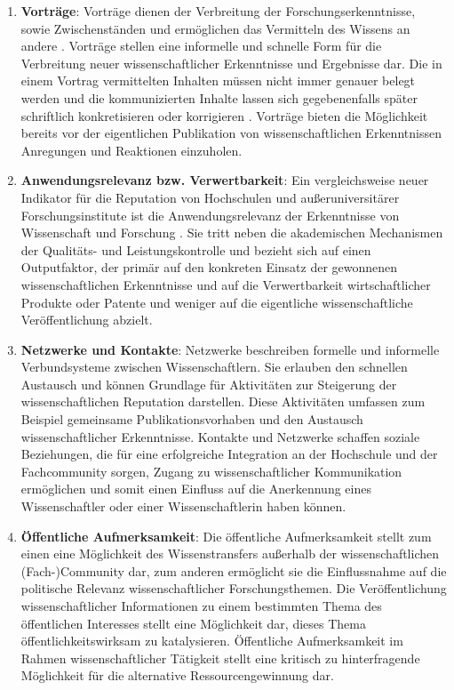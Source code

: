 \begin{enumerate}
\item \textbf{Vorträge}: Vorträge dienen der Verbreitung der Forschungserkenntnisse, sowie Zwischenständen und ermöglichen das Vermitteln des Wissens an andere \cite{Rassenhoevel_2010}. Vorträge stellen eine informelle und schnelle Form für die Verbreitung neuer wissenschaftlicher Erkenntnisse und Ergebnisse dar. Die in einem Vortrag vermittelten Inhalten müssen nicht immer genauer belegt werden und die kommunizierten Inhalte lassen sich gegebenenfalls später schriftlich konkretisieren oder korrigieren \cite{Haberle_2002}. Vorträge bieten die Möglichkeit bereits vor der eigentlichen Publikation von wissenschaftlichen Erkenntnissen Anregungen und Reaktionen einzuholen.
\item\textbf{Anwendungsrelevanz bzw. Verwertbarkeit}: Ein vergleichsweise neuer Indikator für die Reputation von Hochschulen und außeruniversitärer Forschungsinstitute ist die Anwendungsrelevanz der Erkenntnisse von Wissenschaft und Forschung \cite{Simon_2010}. Sie tritt
neben die akademischen Mechanismen der Qualitäts- und Leistungskontrolle \cite[:8]{Buss_2001} und bezieht sich auf einen Outputfaktor, der primär auf den konkreten Einsatz der gewonnenen wissenschaftlichen Erkenntnisse und auf die Verwertbarkeit wirtschaftlicher Produkte oder Patente und weniger auf die eigentliche wissenschaftliche Veröffentlichung abzielt.
\item \textbf{Netzwerke und Kontakte}: Netzwerke beschreiben formelle und informelle Verbundsysteme zwischen Wissenschaftlern. Sie erlauben den schnellen Austausch und können Grundlage für Aktivitäten zur Steigerung der wissenschaftlichen Reputation darstellen. Diese Aktivitäten umfassen zum Beispiel gemeinsame Publikationsvorhaben und den Austausch wissenschaftlicher Erkenntnisse. Kontakte und Netzwerke schaffen soziale Beziehungen, die für eine erfolgreiche Integration an der Hochschule und der Fachcommunity sorgen, Zugang zu wissenschaftlicher Kommunikation ermöglichen und somit einen Einfluss auf die Anerkennung eines Wissenschaftler oder einer Wissenschaftlerin haben können.
\item \textbf{Öffentliche Aufmerksamkeit}: Die öffentliche Aufmerksamkeit stellt zum einen eine Möglichkeit des Wissenstransfers außerhalb der wissenschaftlichen (Fach-)Community dar, zum anderen ermöglicht sie die Einflussnahme auf die politische Relevanz wissenschaftlicher Forschungsthemen. Die Veröffentlichung wissenschaftlicher Informationen zu einem bestimmten Thema des öffentlichen Interesses stellt eine Möglichkeit dar, dieses Thema öffentlichkeitswirksam zu katalysieren. Öffentliche Aufmerksamkeit im Rahmen wissenschaftlicher Tätigkeit stellt eine kritisch zu hinterfragende Möglichkeit für die alternative Ressourcengewinnung dar.

\end{enumerate}
